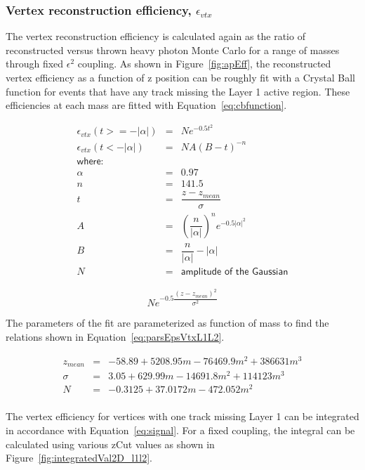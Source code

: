\subsubsection{Vertex reconstruction efficiency, $\epsilon_{vtx}$}

The vertex reconstruction efficiency is calculated again as the ratio of reconstructed versus thrown heavy photon Monte Carlo for a range of masses through fixed $\epsilon^{2}$ coupling. As shown in Figure~\ref{fig:apEff}, the reconstructed vertex efficiency as a function of z position can be roughly fit with a Crystal Ball function for events that have any track missing the Layer 1 active region. These efficiencies at each mass are fitted with Equation~\eqref{eq:cbfunction}.


\begin{eqnarray*}
\label{eq:cbfunction}
\epsilon_{vtx}(t >= -| \alpha |) & = & N e^{-0.5t^{2}}\\
\epsilon_{vtx}(t < -| \alpha |) & = & N A(B-t)^{-n}\\
\textsf{where:}\\
\alpha & = & 0.97\\
n & = & 141.5\\
t & = & \dfrac{z-z_{mean}}{\sigma}\\
A & = & (\dfrac{n}{| \alpha |})^{n}e^{-0.5 |\alpha |^2}\\
B & = & \dfrac{n}{| \alpha |}-|\alpha | \\
N & = & \textsf{amplitude of the Gaussian}
\end{eqnarray*}


\begin{equation}
\label{eq:gausfunction}
Ne^{-0.5\dfrac{(z-z_{mean})^2}{\sigma^2}}
\end{equation}

The parameters of the fit are parameterized as  function of mass to find the relations shown in Equation~\eqref{eq:parsEpsVtxL1L2}.

\begin{eqnarray*}
\label{eq:parsEpsVtxL1L2}
z_{mean} & = & -58.89+5208.95m-76469.9m^2+386631m^3\\
\sigma & = & 3.05+629.99m-14691.8m^2+114123m^3\\
N & = & -0.3125+37.0172m-472.052m^2 \\
\end{eqnarray*}

The vertex efficiency for vertices with one track missing Layer 1 can be integrated in accordance with Equation~\eqref{eq:signal}. For a fixed coupling, the integral can be calculated using various zCut values as shown in Figure~\ref{fig:integratedVal2D_l1l2}.


